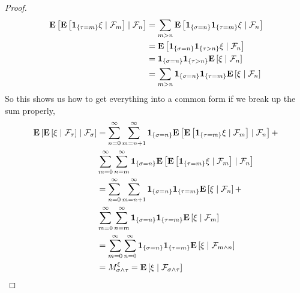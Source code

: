 \documentclass{amsart}
\theoremstyle{remark}
\theoremstyle{definition}
\begin{document}
\begin{proof}
\begin{align*}
\cexpectationlong{\mathcal{F}_n}{\cexpectationlong{\mathcal{F}_m}{\characteristic{
    \lbrace \tau = m \rbrace } \xi}} 
&= \sum_{m>n} \cexpectationlong{\mathcal{F}_n}{\characteristic{\lbrace \sigma = n \rbrace}\characteristic{
    \lbrace \tau = m \rbrace } \xi} \\
&= \cexpectationlong{\mathcal{F}_n}{\characteristic{\lbrace \sigma = n \rbrace}\characteristic{
    \lbrace \tau > n \rbrace } \xi} \\
&=\characteristic{\lbrace \sigma = n \rbrace}\characteristic{
    \lbrace \tau > n \rbrace }  \cexpectationlong{\mathcal{F}_n}{\xi} \\
&= \sum_{m>n} \characteristic{\lbrace \sigma = n \rbrace}\characteristic{
    \lbrace \tau=m \rbrace }  \cexpectationlong{\mathcal{F}_n}{\xi} 
\end{align*}
So this shows us how to get everything into a common form if we break
up the sum properly, 
\begin{align*}
\cexpectationlong{\mathcal{F}_\sigma}{\cexpectationlong{\mathcal{F}_\tau}{\xi}} 
&= \sum_{n=0}^\infty \sum_{m=n+1}^\infty \characteristic{\lbrace \sigma = n \rbrace}
\cexpectationlong{\mathcal{F}_n}{\cexpectationlong{\mathcal{F}_m}{\characteristic{
    \lbrace \tau = m \rbrace } \xi}} + \\
&\sum_{m=0}^\infty \sum_{n=m}^\infty \characteristic{\lbrace \sigma = n \rbrace}
\cexpectationlong{\mathcal{F}_n}{\cexpectationlong{\mathcal{F}_m}{\characteristic{
    \lbrace \tau = m \rbrace } \xi}}  \\
&=\sum_{n=0}^\infty \sum_{m=n+1}^\infty \characteristic{\lbrace \sigma = n \rbrace}\characteristic{
    \lbrace \tau=m \rbrace }  \cexpectationlong{\mathcal{F}_n}{\xi} + \\
&\sum_{m=0}^\infty \sum_{n=m}^\infty \characteristic{\lbrace \sigma = n \rbrace}\characteristic{
    \lbrace \tau=m \rbrace }  \cexpectationlong{\mathcal{F}_m}{\xi}
  \\
&= \sum_{m=0}^\infty \sum_{n=0}^\infty \characteristic{\lbrace \sigma = n \rbrace}\characteristic{
    \lbrace \tau=m \rbrace }  \cexpectationlong{\mathcal{F}_{m\wedge
      n}}{\xi} \\
&= M^\xi_{\sigma \wedge \tau} = \cexpectationlong{\mathcal{F}_{\sigma
    \wedge \tau}}{\xi}
\end{align*}
\end{proof}
\end{document}
